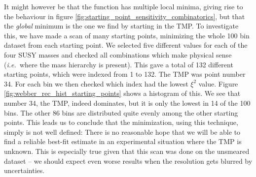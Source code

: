 \documentclass[twoside,english]{uiofysmaster}
\begin{document}


It might however be that the function has multiple local minima, giving rise to the behaviour in figure \ref{fig:starting_point_sensitivity_combinatorics}, but that the {\it global} minimum is the one we find by starting in the TMP. To investigate this, we have made a scan of many starting points, minimizing the whole 100 bin dataset from each starting point. We selected five different values for each of the four SUSY masses and checked all combinations which make physical sense ({\it i.e.\ }where the mass hierarchy is present). This gave a total of 132 different starting points, which were indexed from 1 to 132. The TMP was point number 34. For each bin we then checked which index had the lowest $\xi^2$ value. Figure \ref{fig:webber_rec_hist_starting_points} shows a histogram of this. We see that number 34, the TMP, indeed dominates, but it is only the lowest in 14 of the 100 bins. The other 86 bins are distributed quite evenly among the other starting points. This leads us to conclude that the minimization, using this technique, simply is not well defined: There is no reasonable hope that we will be able to find a reliable best-fit estimate in an experimental situation where the TMP is unknown. This is especially true given that this scan was done on the unsmeared dataset -- we should expect even worse results when the resolution gets blurred by uncertainties.
\end{document}

